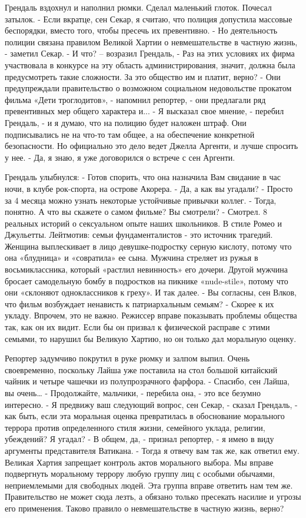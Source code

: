 Грендаль вздохнул и наполнил рюмки. Сделал маленький глоток. Почесал затылок.
- Если вкратце, сен Секар, я считаю, что полиция допустила массовые беспорядки, вместо того, чтобы пресечь их превентивно.
- Но деятельность полиции связана правилом Великой Хартии о невмешательстве в частную жизнь, - заметил Секар.
- И что? – возразил Грендаль, - Раз на этих условиях их фирма участвовала в конкурсе на эту область администрирования, значит, должна была предусмотреть такие сложности. За это общество им и платит, верно?
- Они предупреждали правительство о возможном социальном недовольстве прокатом фильма «Дети троглодитов», - напомнил репортер, - они предлагали ряд превентивных мер общего характера и...
- Я высказал свое мнение, - перебил Грендаль, - и я думаю, что на полицию будет наложен штраф. Они подписывались не на что-то там общее, а на обеспечение конкретной безопасности. Но официально это дело ведет Джелла Аргенти, и лучше спросить у нее.
- Да, я знаю, я уже договорился о встрече с сен Аргенти.

Грендаль улыбнулся:
- Готов спорить, что она назначила Вам свидание в час ночи, в клубе рок-спорта, на острове Акорера.
- Да, а как вы угадали?
- Просто за 4 месяца можно узнать некоторые устойчивые привычки коллег.
- Тогда, понятно. А что вы скажете о самом фильме? Вы смотрели?
- Смотрел. 8 реальных историй о сексуальном опыте наших школьников. В стиле Ромео и Джульетты. Лейтмотив: семьи фундаменталистов - это источник трагедий. Женщина выплескивает в лицо девушке-подростку серную кислоту, потому что она «блудница» и «совратила» ее сына. Мужчина стреляет из ружья в восьмиклассника, который «растлил невинность» его дочери. Другой мужчина бросает самодельную бомбу в подростков на пикнике «nude-stile», потому что они «склоняют одноклассников к греху». И так далее.
- Вы согласны, сен Влков, что фильм возбуждает ненависть к патриархальным семьям?
- Скорее к их укладу. Впрочем, это не важно. Режиссер вправе показывать проблемы общества так, как он их видит. Если бы он призвал к физической расправе с этими семьями, то нарушил бы Великую Хартию, но он только дал моральную оценку.

Репортер задумчиво покрутил в руке рюмку и залпом выпил. Очень своевременно, поскольку Лайша уже поставила на стол большой китайский чайник и четыре чашечки из полупрозрачного фарфора.
- Спасибо, сен Лайша, вы очень…
- Продолжайте, мальчики, - перебила она, - это все безумно интересно.
- Я предвижу ваш следующий вопрос, сен Секар, - сказал Грендаль, - как быть, если эта моральная оценка превратилась в обоснование морального террора против определенного стиля жизни, семейного уклада, религии, убеждений? Я угадал?
- В общем, да, - признал репортер, - я имею в виду аргументы представителя Ватикана.
- Тогда я отвечу вам так же, как ответил ему. Великая Хартия запрещает контроль актов морального выбора. Мы вправе подвергнуть моральному террору любую группу лиц с особыми обычаями, неприемлемыми для свободных людей. Эта группа вправе ответить нам тем же. Правительство не может сюда лезть, а обязано только пресекать насилие и угрозы его применения. Таково правило о невмешательстве в частную жизнь, верно?

